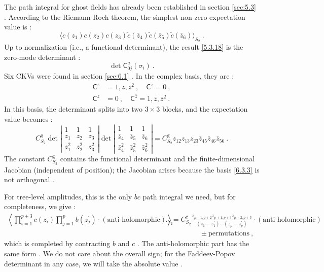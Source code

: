 The path integral for ghost fields has already been established in section \ref{sec:5.3} . According to the Riemann-Roch theorem, the simplest non-zero expectation value is :
\begin{equation}
	\langle c(z_{1}) c(z_{2}) c(z_{3}) \tilde{c}(\bar{z}_{4}) \tilde{c}(\bar{z}_{5}) \tilde{c}(\bar{z}_{6})\rangle_{S_{2}} \:. \label{6.3.1}
\end{equation}
Up to normalization (i.e., a functional determinant), the result \eqref{5.3.18} is the zero-mode determinant :
\begin{equation}
	\operatorname{det} \mathsf{C}_{0 j}^{a}(\sigma_{i}) \:. \label{6.3.2}
\end{equation}
Six CKVs were found in section \ref{sec:6.1} . In the complex basis, they are :
\begin{subequations} \label{6.3.3}
	\begin{align}
		\mathsf{C}^{z} &= 1, z, z^{2}\:, \quad \mathsf{C}^{\bar{z}}=0  \:, \label{6.3.3a} \\
		\mathsf{C}^{z} &= 0\:, \quad \mathsf{C}^{\bar{z}}=1, \bar{z}, \bar{z}^{2} \:. \label{6.3.3b}
	\end{align}
\end{subequations}
In this basis, the determinant splits into two $3 \times 3$ blocks, and the expectation value becomes :
\begin{equation}
	C_{S_{2}}^{\mathrm{g}} \operatorname{det}\left|\begin{array}{ccc}
		1 & 1 & 1 \\
		z_{1} & z_{2} & z_{3} \\
		z_{1}^{2} & z_{2}^{2} & z_{3}^{2}
	\end{array}\right| \operatorname{det}\left|\begin{array}{ccc}
		1 & 1 & 1 \\
		\bar{z}_{4} & \bar{z}_{5} & \bar{z}_{6} \\
		\bar{z}_{4}^{2} & \bar{z}_{5}^{2} & \bar{z}_{6}^{2}
	\end{array}\right|=C_{S_{2}}^{\mathrm{g}} z_{12} z_{13} z_{23} \bar{z}_{45} \bar{z}_{46} \bar{z}_{56} \:. \label{6.3.4}
\end{equation}
The constant $C_{S_{2}}^{\mathrm{g}}$ contains the functional determinant and the finite-dimensional Jacobian (independent of position); the Jacobian arises because the basis \eqref{6.3.3} is not orthogonal .

For tree-level amplitudes, this is the only $bc$ path integral we need, but for completeness, we give :
\begin{align}
	\left\langle\prod_{i=1}^{p+3} c(z_{i}) \prod_{j=1}^{p} b(z_{j}^{\prime}) \cdot(\text{anti-holomorphic})\right\rangle\bigg._{\!\!S_{2}}
	&=C_{S_{2}}^{\mathrm{g}} \frac{z_{p+1, p+2} z_{p+1, p+3} z_{p+2, p+3}}{(z_{1}-z_{1}^{\prime}) \cdots(z_{p}-z_{p}^{\prime})} \cdot(\text {anti-holomorphic})  \nonumber \\
	&\qquad \qquad \pm \text {permutations} \:, \label{6.3.5}
\end{align}
which is completed by contracting $b$ and $c$ . The anti-holomorphic part has the same form . We do not care about the overall sign; for the Faddeev-Popov determinant in any case, we will take the absolute value .

